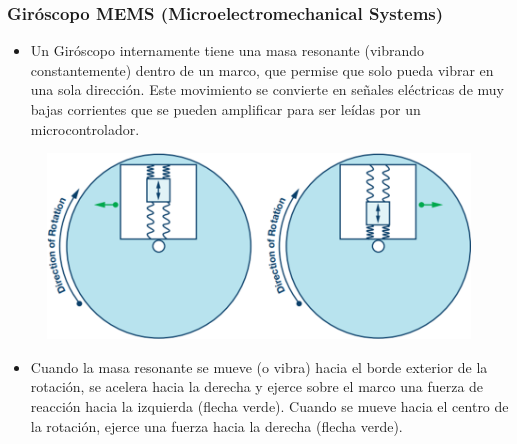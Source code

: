 \begin{frame}
    \frametitle{Giróscopo MEMS (Microelectromechanical Systems)}

    
    \begin{itemize}
        \item Un Giróscopo internamente tiene una masa resonante (vibrando constantemente) dentro de un marco, que permise que solo pueda vibrar en una sola dirección. Este movimiento se convierte en señales eléctricas de muy bajas corrientes que se pueden amplificar para ser leídas por un microcontrolador.
    \end{itemize}
    
    \begin{figure}[!h]
        \centering
        \includegraphics[width=0.4\columnwidth]{images/gyroscope_mems_2.png}
    \end{figure}
    
    \begin{itemize}
        \item Cuando la masa resonante se mueve (o vibra) hacia el borde exterior de la rotación, se acelera hacia la derecha y ejerce sobre el marco una fuerza de reacción hacia la izquierda (flecha verde). Cuando se mueve hacia el centro de la rotación, ejerce una fuerza hacia la derecha (flecha verde).
    \end{itemize}
    
\end{frame}

